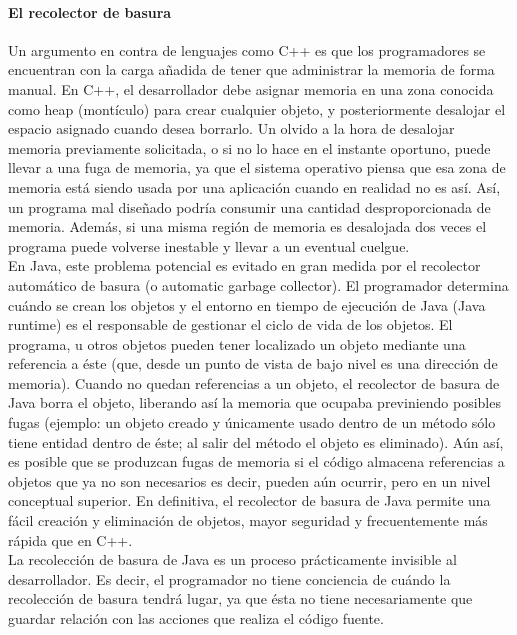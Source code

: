 \begin{description}
\paragraph{El recolector de basura}
Un argumento en contra de lenguajes como C++ es que los programadores se encuentran con la carga a\~nadida de tener que administrar la memoria de forma manual. En C++, el desarrollador debe asignar memoria en una zona conocida como heap (mont\'iculo) para crear cualquier objeto, y posteriormente desalojar el espacio asignado cuando desea borrarlo. Un olvido a la hora de desalojar memoria previamente solicitada, o si no lo hace en el instante oportuno, puede llevar a una fuga de memoria, ya que el sistema operativo piensa que esa zona de memoria est\'a siendo usada por una aplicaci\'on cuando en realidad no es as\'i. As\'i, un programa mal dise\~nado podr\'ia consumir una cantidad desproporcionada de memoria. Adem\'as, si una misma regi\'on de memoria es desalojada dos veces el programa puede volverse inestable y llevar a un eventual cuelgue.\\

En Java, este problema potencial es evitado en gran medida por el recolector autom\'atico de basura (o automatic garbage collector). El programador determina cu\'ando se crean los objetos y el entorno en tiempo de ejecuci\'on de Java (Java runtime) es el responsable de gestionar el ciclo de vida de los objetos. El programa, u otros objetos pueden tener localizado un objeto mediante una referencia a \'este (que, desde un punto de vista de bajo nivel es una direcci\'on de memoria). Cuando no quedan referencias a un objeto, el recolector de basura de Java borra el objeto, liberando as\'i la memoria que ocupaba previniendo posibles fugas (ejemplo: un objeto creado y \'unicamente usado dentro de un m\'etodo s\'olo tiene entidad dentro de \'este; al salir del m\'etodo el objeto es eliminado). A\'un as\'i, es posible que se produzcan fugas de memoria si el c\'odigo almacena referencias a objetos que ya no son necesarios es decir, pueden a\'un ocurrir, pero en un nivel conceptual superior. En definitiva, el recolector de basura de Java permite una f\'acil creaci\'on y eliminaci\'on de objetos, mayor seguridad y frecuentemente m\'as r\'apida que en C++.\\

La recolecci\'on de basura de Java es un proceso pr\'acticamente invisible al desarrollador. Es decir, el programador no tiene conciencia de cu\'ando la recolecci\'on de basura tendr\'a lugar, ya que \'esta no tiene necesariamente que guardar relaci\'on con las acciones que realiza el c\'odigo fuente.\\


\end{description}
